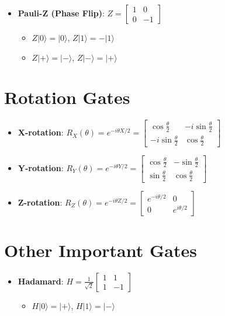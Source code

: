 \begin{multicols}{3}
\begin{itemize}[leftmargin=*,nosep,topsep=0pt]
        \item \textbf{Pauli-Z (Phase Flip)}: $Z = \begin{bmatrix} 1 & 0 \\ 0 & -1
          \end{bmatrix}$
          \begin{itemize}[nosep]
            \item $Z|0\rangle = |0\rangle$, $Z|1\rangle = -|1\rangle$
            \item $Z|+\rangle = |-\rangle$, $Z|-\rangle = |+\rangle$
          \end{itemize}
        \end{itemize}

        \section*{Rotation Gates}
        \begin{itemize}[leftmargin=*,nosep,topsep=0pt]
          \item \textbf{X-rotation}: $R_X(\theta) = e^{-i\theta X/2} =
            \begin{bmatrix} \cos\frac{\theta}{2} & -i\sin\frac{\theta}{2} \\
            -i\sin\frac{\theta}{2} & \cos\frac{\theta}{2} \end{bmatrix}$

          \item \textbf{Y-rotation}: $R_Y(\theta) = e^{-i\theta Y/2} =
              \begin{bmatrix} \cos\frac{\theta}{2} & -\sin\frac{\theta}{2} \\
              \sin\frac{\theta}{2} & \cos\frac{\theta}{2} \end{bmatrix}$

            \item \textbf{Z-rotation}: $R_Z(\theta) = e^{-i\theta Z/2} =
                \begin{bmatrix} e^{-i\theta/2} & 0 \\ 0 & e^{i\theta/2} \end{bmatrix}$
            \end{itemize}

            \section*{Other Important Gates}
            \begin{itemize}[leftmargin=*,nosep,topsep=0pt]
              \item \textbf{Hadamard}: $H = \frac{1}{\sqrt{2}}\begin{bmatrix} 1 & 1 \\
                1 & -1 \end{bmatrix}$
                \begin{itemize}[nosep]
                  \item $H|0\rangle = |+\rangle$, $H|1\rangle = |-\rangle$


\end{itemize}
\end{itemize}
\end{multicols}
